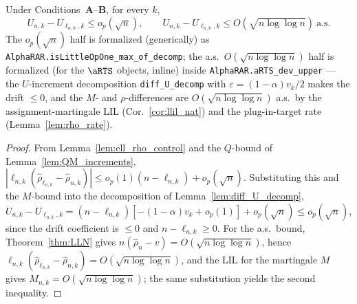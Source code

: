 \begin{lemma}\label{lem:U_increment_bound}
Under Conditions~\textbf{A}--\textbf{B}, for every $k$,
\[
  U_{n,k} - U_{\ell_{n,k},k} \le o_p(\sqrt n),
  \qquad
  U_{n,k} - U_{\ell_{n,k},k} \le O(\sqrt{n\log\log n})\ \text{a.s.}
\]
The $o_p(\sqrt n)$ half is formalized (generically) as \texttt{AlphaRAR.isLittleOpOne\_max\_of\_decomp};
the a.s.\ $O(\sqrt{n\log\log n})$ half is formalized (for the $\aRTS$ objects, inline) inside
\texttt{AlphaRAR.aRTS\_dev\_upper} --- the $U$-increment decomposition \texttt{diff\_U\_decomp} with
$\varepsilon=(1-\alpha)v_k/2$ makes the drift $\le0$, and the $M$- and $\rho$-differences are
$O(\sqrt{n\log\log n})$ a.s.\ by the assignment-martingale LIL (Cor.~\ref{cor:llil_nat}) and the
plug-in-target rate (Lemma~\ref{lem:rho_rate}).
\end{lemma}

\begin{proof}
From Lemma~\ref{lem:ell_rho_control} and the $Q$-bound of
Lemma~\ref{lem:QM_increments},
$|\ell_{n,k}(\hat{\rho}_{\ell_{n,k}}-\hat{\rho}_{n,k})| \le o_p(1)(n-\ell_{n,k}) + o_p(\sqrt n)$.
Substituting this and the $M$-bound into the decomposition of
Lemma~\ref{lem:diff_U_decomp},
$U_{n,k}-U_{\ell_{n,k},k} = (n-\ell_{n,k})[-(1-\alpha)v_k+o_p(1)] + o_p(\sqrt n)
 \le o_p(\sqrt n)$, since the drift coefficient is $\le0$ and $n-\ell_{n,k}\ge0$.
For the a.s.\ bound, Theorem~\ref{thm:LLN} gives $n(\hat{\rho}_n-v)=O(\sqrt{n\log\log n})$,
hence $\ell_{n,k}(\hat{\rho}_{\ell_{n,k}}-\hat{\rho}_{n,k})=O(\sqrt{n\log\log n})$,
and the LIL for the martingale $M$ gives $M_{n,k}=O(\sqrt{n\log\log n})$; the same
substitution yields the second inequality.
\end{proof}

